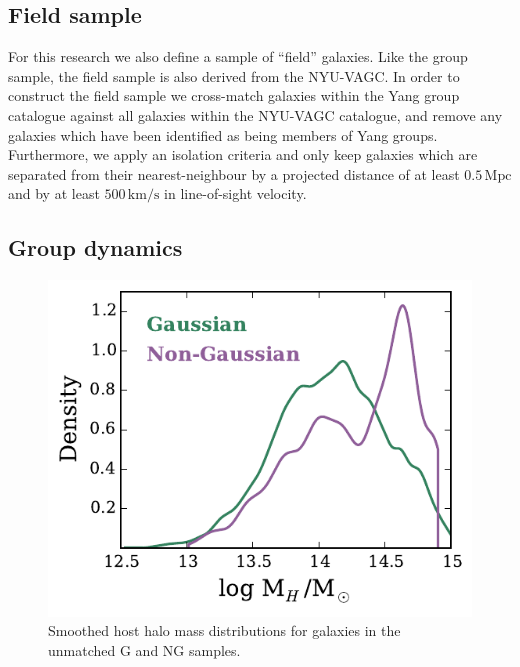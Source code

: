 \documentclass[a4paper,fleqn,usenatbib]{mnras}
\begin{document}
\subsection{Field sample}

For this research we also define a sample of ``field'' galaxies.  Like
the group sample, the field sample is also derived from the NYU-VAGC.
In order to construct the field sample we cross-match galaxies within
the Yang group catalogue against all galaxies within the NYU-VAGC
catalogue, and remove any galaxies which have been identified as being
members of Yang groups.  Furthermore, we apply an isolation
criteria and only keep galaxies which are separated from their
nearest-neighbour by a projected distance of at least
$0.5\,\mathrm{Mpc}$ and by at least $500\,\mathrm{km/s}$ in
line-of-sight velocity.

\subsection{Group dynamics}

\begin{figure}
  \centering
  \includegraphics[width=\columnwidth]{mhdist_um.pdf}
  \caption{Smoothed host halo mass distributions for galaxies in the
    unmatched G and NG samples.}
  \label{fig:mhdist_um}
\end{figure}
\end{document}
